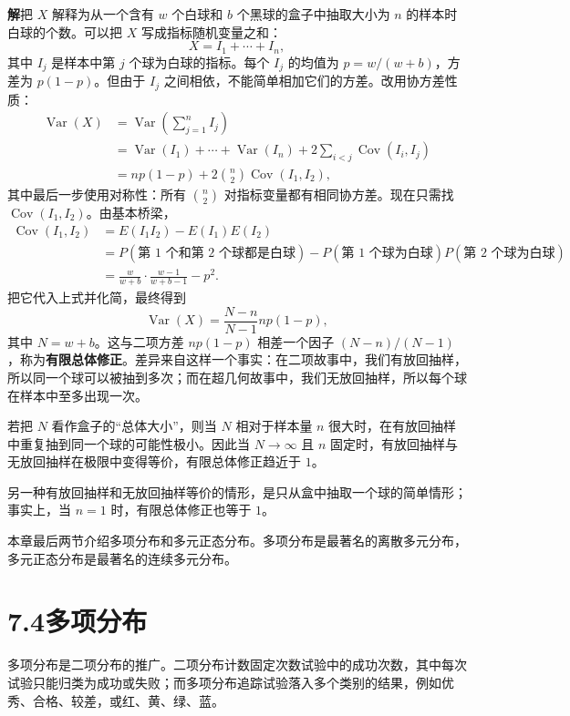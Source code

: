 \documentclass[UTF8,12pt,a4paper,fontset=fandol]{ctexart}
\begin{document}
\noindent\textbf{解}\quad 把 $X$ 解释为从一个含有 $w$ 个白球和 $b$ 个黑球的盒子中抽取大小为 $n$ 的样本时白球的个数。可以把 $X$ 写成指标随机变量之和：
\[
  X=I_1+\cdots+I_n,
\]
其中 $I_j$ 是样本中第 $j$ 个球为白球的指标。每个 $I_j$ 的均值为 $p=w/(w+b)$，方差为 $p(1-p)$。但由于 $I_j$ 之间相依，不能简单相加它们的方差。改用协方差性质：
\[
\begin{aligned}
  \operatorname{Var}(X)
  &=\operatorname{Var}\left(\sum_{j=1}^{n}I_j\right)\\
  &=\operatorname{Var}(I_1)+\cdots+\operatorname{Var}(I_n)
    +2\sum_{i<j}\operatorname{Cov}(I_i,I_j)\\
  &=np(1-p)+2{n\choose 2}\operatorname{Cov}(I_1,I_2),
\end{aligned}
\]
其中最后一步使用对称性：所有 ${n\choose 2}$ 对指标变量都有相同协方差。现在只需找 $\operatorname{Cov}(I_1,I_2)$。由基本桥梁，
\[
\begin{aligned}
  \operatorname{Cov}(I_1,I_2)
  &=E(I_1I_2)-E(I_1)E(I_2)\\
  &=P(\text{第 1 个和第 2 个球都是白球})
    -P(\text{第 1 个球为白球})P(\text{第 2 个球为白球})\\
  &=\frac{w}{w+b}\cdot \frac{w-1}{w+b-1}-p^2.
\end{aligned}
\]
把它代入上式并化简，最终得到
\[
  \operatorname{Var}(X)=\frac{N-n}{N-1}np(1-p),
\]
其中 $N=w+b$。这与二项方差 $np(1-p)$ 相差一个因子 $(N-n)/(N-1)$，称为\textbf{有限总体修正}。差异来自这样一个事实：在二项故事中，我们有放回抽样，所以同一个球可以被抽到多次；而在超几何故事中，我们无放回抽样，所以每个球在样本中至多出现一次。

若把 $N$ 看作盒子的“总体大小”，则当 $N$ 相对于样本量 $n$ 很大时，在有放回抽样中重复抽到同一个球的可能性极小。因此当 $N\to\infty$ 且 $n$ 固定时，有放回抽样与无放回抽样在极限中变得等价，有限总体修正趋近于 $1$。

另一种有放回抽样和无放回抽样等价的情形，是只从盒中抽取一个球的简单情形；事实上，当 $n=1$ 时，有限总体修正也等于 $1$。

本章最后两节介绍多项分布和多元正态分布。多项分布是最著名的离散多元分布，多元正态分布是最著名的连续多元分布。

\section*{7.4\quad 多项分布}

多项分布是二项分布的推广。二项分布计数固定次数试验中的成功次数，其中每次试验只能归类为成功或失败；而多项分布追踪试验落入多个类别的结果，例如优秀、合格、较差，或红、黄、绿、蓝。
\end{document}
